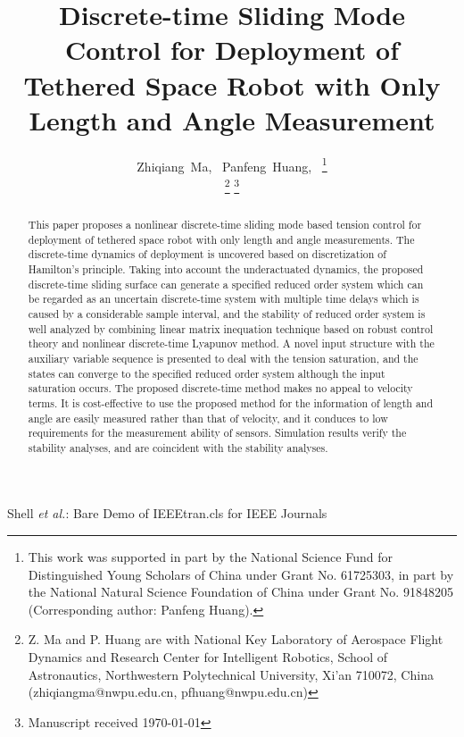 \documentclass[10pt,final,journal]{IEEEtran}
\begin{document}
\title{Discrete-time Sliding Mode Control for Deployment of Tethered Space Robot with Only Length and Angle Measurement}

\author{Zhiqiang~Ma,~
        Panfeng~Huang,~
\thanks{This work was supported in part by the National Science Fund for Distinguished Young Scholars of China under Grant No. 61725303, in part by the National Natural Science Foundation of China under Grant No. 91848205 (Corresponding
author: Panfeng Huang).}

\thanks{Z. Ma and P. Huang are with National Key Laboratory of Aerospace Flight Dynamics and Research Center for Intelligent Robotics, School of Astronautics, Northwestern Polytechnical University, Xi'an 710072, China (zhiqiangma@nwpu.edu.cn, pfhuang@nwpu.edu.cn)}%
\thanks{Manuscript received \today}
}
%
{Shell \MakeLowercase{\textit{et al.}}: Bare Demo of IEEEtran.cls for IEEE Journals}

\maketitle

\begin{abstract}
This paper proposes a nonlinear discrete-time sliding mode based tension control for deployment of tethered space robot with only length and angle measurements. 
The discrete-time dynamics of deployment is uncovered based on discretization of Hamilton’s principle. Taking into account the underactuated dynamics, the proposed discrete-time sliding surface can generate a specified reduced order  system which can be regarded as an uncertain discrete-time system with multiple time delays which is caused by a considerable sample interval, and the stability of reduced order  system is well analyzed by combining linear matrix inequation technique based on robust control theory and nonlinear discrete-time Lyapunov method. A novel input structure with the auxiliary variable sequence is presented to deal with the tension saturation, and the states can converge to the specified reduced order  system although the input saturation occurs. 
The proposed discrete-time method makes no appeal to velocity terms. It is cost-effective to use the proposed method for  the information of length and angle are easily measured rather than that of velocity, and it conduces to low requirements for the measurement ability of sensors.  
Simulation results verify the stability analyses, and are coincident with the stability analyses.

\end{abstract}
\end{document}

